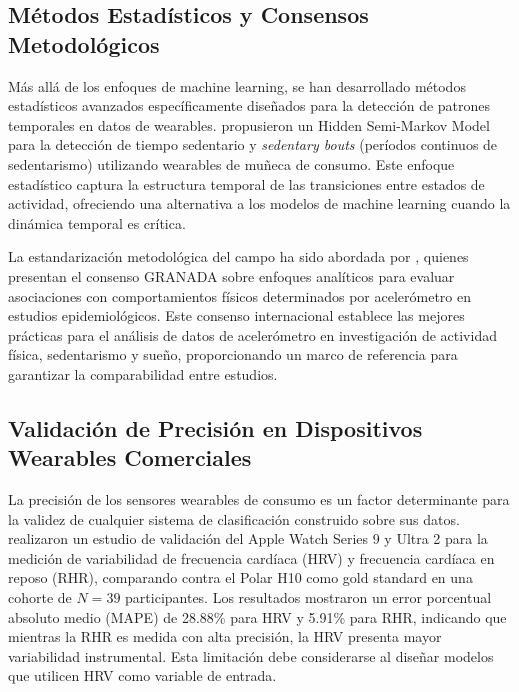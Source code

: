 
\subsection{Métodos Estadísticos y Consensos Metodológicos}
\label{subsec:metodos_estadisticos}

Más allá de los enfoques de machine learning, se han desarrollado métodos estadísticos avanzados específicamente diseñados para la detección de patrones temporales en datos de wearables. \cite{Salim2024STEPHEN} propusieron un Hidden Semi-Markov Model para la detección de tiempo sedentario y \textit{sedentary bouts} (períodos continuos de sedentarismo) utilizando wearables de muñeca de consumo. Este enfoque estadístico captura la estructura temporal de las transiciones entre estados de actividad, ofreciendo una alternativa a los modelos de machine learning cuando la dinámica temporal es crítica.

La estandarización metodológica del campo ha sido abordada por \cite{Migueles2022GRANADA}, quienes presentan el consenso GRANADA sobre enfoques analíticos para evaluar asociaciones con comportamientos físicos determinados por acelerómetro en estudios epidemiológicos. Este consenso internacional establece las mejores prácticas para el análisis de datos de acelerómetro en investigación de actividad física, sedentarismo y sueño, proporcionando un marco de referencia para garantizar la comparabilidad entre estudios.


\subsection{Validación de Precisión en Dispositivos Wearables Comerciales}
\label{subsec:validacion_wearables}

La precisión de los sensores wearables de consumo es un factor determinante para la validez de cualquier sistema de clasificación construido sobre sus datos. \cite{OGrady2024AppleWatch} realizaron un estudio de validación del Apple Watch Series 9 y Ultra 2 para la medición de variabilidad de frecuencia cardíaca (HRV) y frecuencia cardíaca en reposo (RHR), comparando contra el Polar H10 como gold standard en una cohorte de $N=39$ participantes. Los resultados mostraron un error porcentual absoluto medio (MAPE) de 28.88\% para HRV y 5.91\% para RHR, indicando que mientras la RHR es medida con alta precisión, la HRV presenta mayor variabilidad instrumental. Esta limitación debe considerarse al diseñar modelos que utilicen HRV como variable de entrada.

